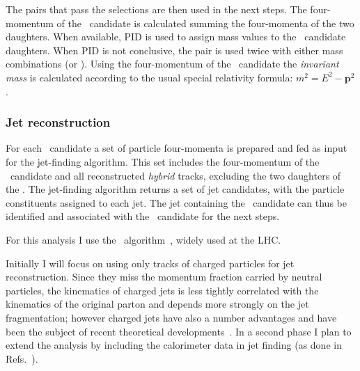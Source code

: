 \documentclass[12pt, a4paper, twoside, titlepage]{article}
\begin{document}
The pairs that pass the selections are then used in the next steps.
The four-momentum of the \Dzero\ candidate is calculated summing the four-momenta of the two daughters.
When available, PID is used to assign mass values to the \Dzero\ candidate daughters. When PID is not conclusive,
the pair is used twice with either mass combinations (\pip \kam or \pim \kap). Using the four-momentum of the \Dzero\ candidate
the \emph{invariant mass} is calculated according to the usual special relativity formula: $m^2 = E^2 - \bm{p}^2$.

\subsubsection{Jet reconstruction}
For each \Dzero\ candidate a set of particle four-momenta is prepared and fed as input for the jet-finding algorithm.
This set includes the four-momentum of the \Dzero\ candidate and all reconstructed \emph{hybrid} tracks,
excluding the two daughters of the \Dzero. The jet-finding algorithm returns a set of jet candidates, with the particle constituents
assigned to each jet. The jet containing the \Dzero\ candidate can thus be identified and associated with the \Dzero\ candidate for the next steps.

For this analysis I use the \antikt\ algorithm~\cite{Cacciari:2008c}, widely used at the LHC.

Initially I will focus on using only tracks of charged particles for jet reconstruction. Since they miss the momentum
fraction carried by neutral particles, the kinematics of charged jets is less tightly correlated with the kinematics
of the original parton and depends more strongly on the jet fragmentation; however charged jets have also a number advantages
and have been the subject of recent theoretical developments~\cite{Thaler:2013}.
In a second phase I plan to extend the analysis by including the calorimeter data in jet finding (as done in Refs.~\cite{ALICE:2013c, ALICE:2015a}).
\end{document}
